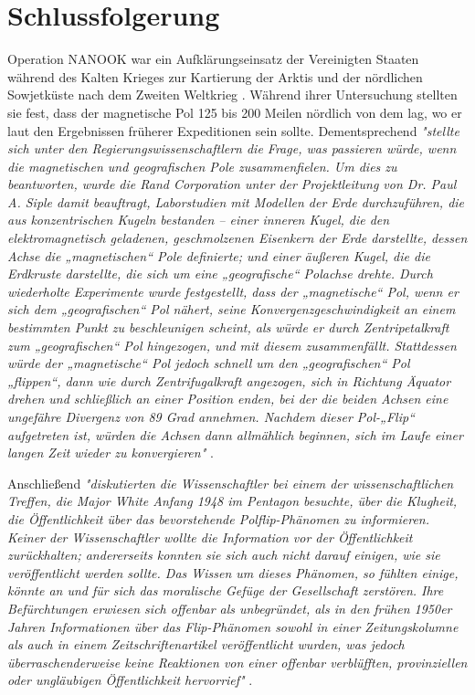 \documentclass[10pt,twocolumn,letterpaper]{article}
\begin{document}
\section{Schlussfolgerung}

Operation NANOOK war ein Aufklärungseinsatz der Vereinigten Staaten während des Kalten Krieges zur Kartierung der Arktis und der nördlichen Sowjetküste nach dem Zweiten Weltkrieg \cite{137}. Während ihrer Untersuchung stellten sie fest, dass der magnetische Pol 125 bis 200 Meilen nördlich von dem lag, wo er laut den Ergebnissen früherer Expeditionen sein sollte. Dementsprechend \textit{"stellte sich unter den Regierungswissenschaftlern die Frage, was passieren würde, wenn die magnetischen und geografischen Pole zusammenfielen. Um dies zu beantworten, wurde die Rand Corporation unter der Projektleitung von Dr. Paul A. Siple damit beauftragt, Laborstudien mit Modellen der Erde durchzuführen, die aus konzentrischen Kugeln bestanden – einer inneren Kugel, die den elektromagnetisch geladenen, geschmolzenen Eisenkern der Erde darstellte, dessen Achse die „magnetischen“ Pole definierte; und einer äußeren Kugel, die die Erdkruste darstellte, die sich um eine „geografische“ Polachse drehte. Durch wiederholte Experimente wurde festgestellt, dass der „magnetische“ Pol, wenn er sich dem „geografischen“ Pol nähert, seine Konvergenzgeschwindigkeit an einem bestimmten Punkt zu beschleunigen scheint, als würde er durch Zentripetalkraft zum „geografischen“ Pol hingezogen, und mit diesem zusammenfällt. Stattdessen würde der „magnetische“ Pol jedoch schnell um den „geografischen“ Pol „flippen“, dann wie durch Zentrifugalkraft angezogen, sich in Richtung Äquator drehen und schließlich an einer Position enden, bei der die beiden Achsen eine ungefähre Divergenz von 89 Grad annehmen. Nachdem dieser Pol-„Flip“ aufgetreten ist, würden die Achsen dann allmählich beginnen, sich im Laufe einer langen Zeit wieder zu konvergieren"} \cite{138,139}.

Anschließend \textit{"diskutierten die Wissenschaftler bei einem der wissenschaftlichen Treffen, die Major White Anfang 1948 im Pentagon besuchte, über die Klugheit, die Öffentlichkeit über das bevorstehende Polflip-Phänomen zu informieren. Keiner der Wissenschaftler wollte die Information vor der Öffentlichkeit zurückhalten; andererseits konnten sie sich auch nicht darauf einigen, wie sie veröffentlicht werden sollte. Das Wissen um dieses Phänomen, so fühlten einige, könnte an und für sich das moralische Gefüge der Gesellschaft zerstören. Ihre Befürchtungen erwiesen sich offenbar als unbegründet, als in den frühen 1950er Jahren Informationen über das Flip-Phänomen sowohl in einer Zeitungskolumne als auch in einem Zeitschriftenartikel veröffentlicht wurden, was jedoch überraschenderweise keine Reaktionen von einer offenbar verblüfften, provinziellen oder ungläubigen Öffentlichkeit hervorrief"} \cite{138,139}.
\end{document}
